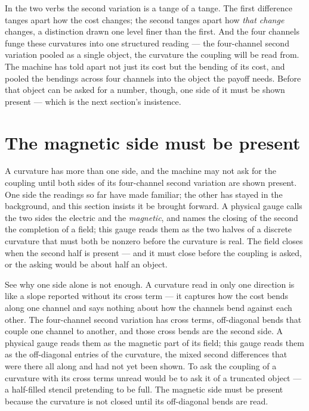 In the two verbs the second variation is a tange of a tange. The first difference tanges apart how the cost changes; the
second tanges apart how \emph{that change} changes, a distinction drawn one level finer than the first. And the four
channels funge these curvatures into one structured reading --- the four-channel second variation pooled as a single
object, the curvature the coupling will be read from. The machine has told apart not just its cost but the bending of its
cost, and pooled the bendings across four channels into the object the payoff needs. Before that object can be asked for
a number, though, one side of it must be shown present --- which is the next section's insistence.

\section{The magnetic side must be present}

A curvature has more than one side, and the machine may not ask for the coupling until both sides of its four-channel
second variation are shown present. One side the readings so far have made familiar; the other has stayed in the
background, and this section insists it be brought forward. A physical gauge calls the two sides the electric and the
\emph{magnetic}, and names the closing of the second the completion of a field; this gauge reads them as the two halves
of a discrete curvature that must both be nonzero before the curvature is real. The field closes when the second half is
present --- and it must close before the coupling is asked, or the asking would be about half an object.

See why one side alone is not enough. A curvature read in only one direction is like a slope reported without its cross
term --- it captures how the cost bends along one channel and says nothing about how the channels bend against each
other. The four-channel second variation has cross terms, off-diagonal bends that couple one channel to another, and
those cross bends are the second side. A physical gauge reads them as the magnetic part of its field; this gauge reads
them as the off-diagonal entries of the curvature, the mixed second differences that were there all along and had not yet
been shown. To ask the coupling of a curvature with its cross terms unread would be to ask it of a truncated object --- a
half-filled stencil pretending to be full. The magnetic side must be present because the curvature is not closed until
its off-diagonal bends are read.

